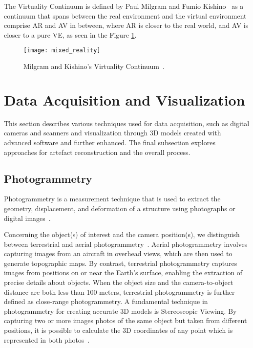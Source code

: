 The Virtuality Continuum is defined by Paul Milgram and Fumio Kishino~\cite{milgram1994taxonomy} as a continuum that spans between the real environment
and the virtual environment comprise \gls{AR} and \gls{AV}
in between, where \gls{AR} is closer to the real world, and \gls{AV} is closer to a pure \gls{VE}, as seen in the Figure \ref{fig:mixed_reality}.

\begin{figure}[htbp]
    \centering
    \texttt{[image: mixed\_reality]}
    \caption{Milgram and Kishino’s Virtuality Continuum~\cite{milgram1994taxonomy}.}
    \label{fig:mixed_reality} 
\end{figure} 
\FloatBarrier


\section{ Data Acquisition and Visualization}
\label{sec:data}

This section describes various techniques used for data acquisition, such as digital cameras and scanners and visualization through 3D models created with advanced software and further enhanced. 
The final subsection explores approaches for artefact reconstruction and the overall process.

\subsection{Photogrammetry}
\label{sec:photogrammetry}

Photogrammetry is a measurement technique that is used to extract the geometry, displacement, and deformation of a
structure using photographs or digital images~\cite{Baqersad2017Photogrammetry}.

Concerning the object(s) of interest and the camera position(s), we distinguish
between terrestrial and aerial photogrammetry~\cite{linder2016digital}.
Aerial photogrammetry involves capturing images from an aircraft in overhead views, which are then used to generate topographic maps. 
By contrast, terrestrial photogrammetry captures images from positions on or near the Earth’s surface, enabling the extraction of precise details about objects.
When the object size and the camera-to-object 
distance are both less than 100 meters, terrestrial photogrammetry is further defined as close-range photogrammetry. A fundamental technique in photogrammetry for creating accurate \gls{3D} models is Stereoscopic Viewing. 
By capturing two or more images photos of the same object but taken from different positions, it is possible to calculate the \gls{3D} coordinates of any point which is represented in both photos~\cite{linder2016digital}. 

